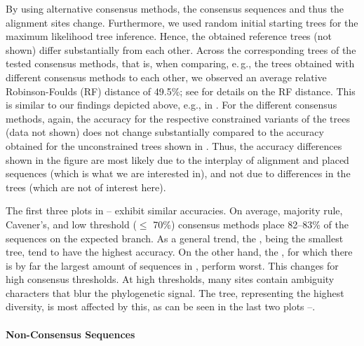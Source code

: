 By using alternative consensus methods, the consensus sequences and thus the alignment sites change.
Furthermore, we used random initial starting trees for the maximum likelihood tree inference.
Hence, the obtained reference trees (not shown) differ substantially from each other.
Across the corresponding trees of the tested consensus methods,
that is, when comparing, e.\,g., the  trees obtained with different consensus methods to each other,
we observed an average relative Robinson-Foulds (RF) distance \cite{Robinson1981} of 49.5\%;
see  for details on the RF distance.
This is similar to our findings depicted above, e.g., in .
For the different consensus methods, again,
the accuracy for the respective constrained variants of the trees (data not shown)
does not change substantially compared to the accuracy obtained for the unconstrained trees shown in .
Thus, the accuracy differences shown in the figure are most likely due to
the interplay of alignment and placed sequences (which is what we are interested in),
and not due to differences in the trees (which are not of interest here).

The first three plots in --
exhibit similar accuracies.
On average, majority rule, Cavener's, and low threshold ($\leq$ 70\%) consensus methods
place 82--83\% of the sequences on the expected branch.
As a general trend, the , being the smallest tree, tend to have the highest accuracy.
On the other hand, the , 
for which there is by far the largest amount of sequences in , perform worst.
This changes for high consensus thresholds. %
At high thresholds, many sites contain ambiguity characters that blur the phylogenetic signal.
The  tree, representing the highest diversity, is most affected by this,
as can be seen in the last two plots 
--.

\paragraph{Non-Consensus Sequences}
\label{ch:AutomaticTrees:sec:Evaluation:sub:Accuracy:par:SingleSequences}

